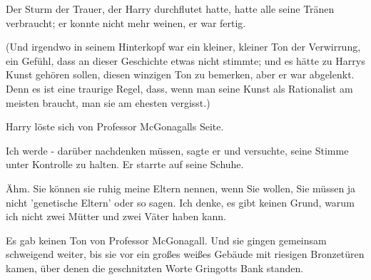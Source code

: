 Der Sturm der Trauer, der Harry durchflutet hatte, hatte alle seine Tränen
verbraucht; er konnte nicht mehr weinen, er war fertig.

(Und irgendwo in seinem Hinterkopf war ein kleiner, kleiner Ton der Verwirrung,
ein Gefühl, dass an dieser Geschichte etwas nicht stimmte; und es hätte zu
Harrys Kunst gehören sollen, diesen winzigen Ton zu bemerken, aber er war
abgelenkt. Denn es ist eine traurige Regel, dass, wenn man seine Kunst als
Rationalist am meisten braucht, man sie am ehesten vergisst.)

Harry löste sich von Professor McGonagalls Seite.

\glqq Ich werde - darüber nachdenken müssen\grqq{}, sagte er und versuchte,
seine Stimme unter Kontrolle zu halten. Er starrte auf seine Schuhe.

\glqq Ähm. Sie können sie ruhig meine Eltern nennen, wenn Sie wollen, Sie müssen
ja nicht 'genetische Eltern' oder so sagen. Ich denke, es gibt keinen Grund,
warum ich nicht zwei Mütter und zwei Väter haben kann.\grqq{}

Es gab keinen Ton von Professor McGonagall. Und sie gingen gemeinsam schweigend
weiter, bis sie vor ein großes weißes Gebäude mit riesigen Bronzetüren kamen,
über denen die geschnitzten Worte \glqq Gringotts Bank\grqq{} standen.